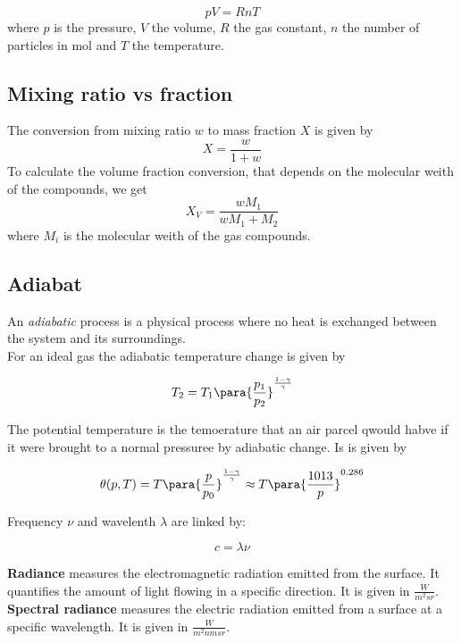 \documentclass[12pt, a4paper]{article} %
\begin{document}
\begin{equation}
	pV = RnT
\end{equation}
where $p$ is the pressure, $V$ the volume, $R$ the gas constant, $n$ the number of particles in mol and $T$ the temperature.

\subsection{Mixing ratio vs fraction}

The conversion from mixing ratio $w$ to mass fraction $X$ is given by
\begin{equation}
	X = \frac{w}{1+w}
\end{equation}
To calculate the volume fraction conversion, that depends on the molecular weith of the compounds, we get
\begin{equation}
	X_V = \frac{w M_1}{wM_1 + M_2}
\end{equation}
where $M_i$ is the molecular weith of the gas compounds.

\subsection{Adiabat}

An \emph{adiabatic} process is a physical process where no heat is exchanged between the system and its surroundings. \\

For an ideal gas the adiabatic temperature  change is given by

\begin{equation}
	T_2 = T_1 \para{\frac{p_1}{p_2}}^{\frac{1 - \gamma}{\gamma}}
\end{equation}

The potential temperature is the temoerature that an air parcel qwould habve if it were brought to a normal pressuree by adiabatic change. Is is given by

\begin{equation}
	\theta(p, T) = T \para{\frac{p}{p_0}}^{\frac{1 - \gamma}{\gamma}} \approx T \para{\frac{1013}{p}}^{0.286}
\end{equation}

Frequency $\nu$ and wavelenth $\lambda$ are linked by:

\begin{equation}
	c = \lambda \nu
\end{equation}

\textbf{Radiance} measures the electromagnetic radiation emitted from the surface. It quantifies the amount of light flowing in a specific direction. It is given in $\frac{W}{m^2sr}$. \textbf{Spectral radiance} measures the electric radiation emitted from a surface at a specific wavelength. It is given in $\frac{W}{m^2 nm sr}$. \\
\end{document}

